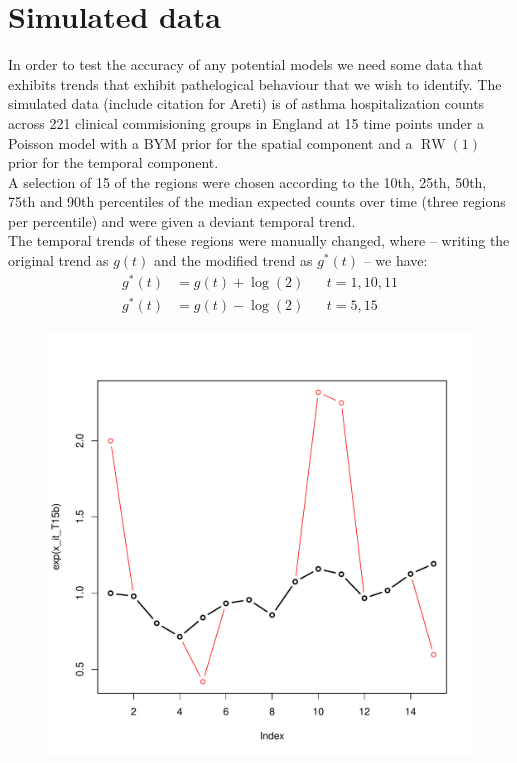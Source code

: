 \documentclass{article}
\begin{document}
\section{Simulated data}

In order to test the accuracy of any potential models we need some data that exhibits trends that exhibit pathelogical behaviour that we wish to identify. The simulated data (include citation for Areti) is of asthma hospitalization counts across 221 clinical commisioning groups in England at 15 time points under a Poisson model with a BYM prior for the spatial component and a $\operatorname{RW}(1)$ prior for the temporal component. \\

A selection of 15 of the regions were chosen according to the 10th, 25th, 50th, 75th and 90th percentiles of the median expected counts over time (three regions per percentile) and were given a deviant temporal trend. \\

The temporal trends of these regions were manually changed, where -- writing the original trend as $g(t)$ and the modified trend as $g^*(t)$ -- we have:
\begin{align}
g^*(t) &= g(t) + \log(2) && t = 1, 10, 11 \\ 
g^*(t) &= g(t) - \log(2) && t = 5, 15
\end{align}

\begin{figure}
\includegraphics[scale=0.5]{plot_time_effects}
\centering
\end{figure}
\end{document}
